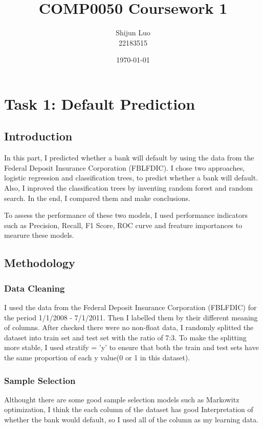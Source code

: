 \documentclass[11pt]{report}
\begin{document}
\title{COMP0050 Coursework 1}
\author{Shijun Luo \\22183515}
\date{\today}
\maketitle

\chapter{Task 1: Default Prediction}
\section{Introduction}

In this part, I predicted whether a bank will default by using the data from the Federal Deposit Insurance Corporation (FBLFDIC). I chose two approaches, logistic regression and classification trees, to predict whether a bank will default. Also, I inproved the classification trees by inventing random forest and random search. In the end, I compared them and make conclusions.

To assess the performance of these two models, I used performance indicators such as Precision, Recall, F1 Score, ROC curve and freature importances to mearure these models.

\section{Methodology}
\subsection{Data Cleaning}
I used the data from the Federal Deposit Insurance Corporation (FBLFDIC) for the period 1/1/2008 - 7/1/2011. Then I labelled them by their different meaning of  columns. After checked there were no non-float data, I randomly splitted the dataset into train set and test set with the ratio of 7:3. To make the splitting more stable, I used stratify = 'y' to ensure that both the train and test sets have the same proportion of each y value(0 or 1 in this dataset). 

\subsection{Sample Selection}
Althought there are some good sample selection models such as Markowitz optimization, I think the each column of the dataset has good Interpretation of whether the bank would default, so I used all of the column as my learning data.
\end{document}
